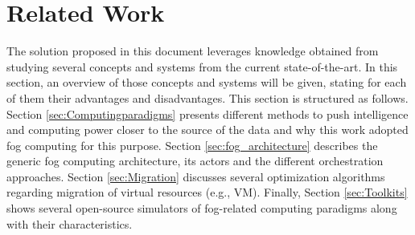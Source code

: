 \chapter{Related Work}
\label{sec:RelatedWork}

The solution proposed in this document leverages knowledge obtained from studying several concepts and systems from the current state-of-the-art. In this section, an overview of those concepts and systems will be given, stating for each of them their advantages and disadvantages. This section is structured as follows. Section \ref{sec:Computingparadigms} presents different methods to push intelligence and computing power closer to the source of the data and why this work adopted fog computing for this purpose. Section \ref{sec:fog_architecture} describes the generic fog computing architecture, its actors and the different orchestration approaches. Section \ref{sec:Migration} discusses several optimization algorithms regarding migration of virtual resources (e.g., VM). Finally, Section \ref{sec:Toolkits} shows several open-source simulators of fog-related computing paradigms along with their characteristics.





